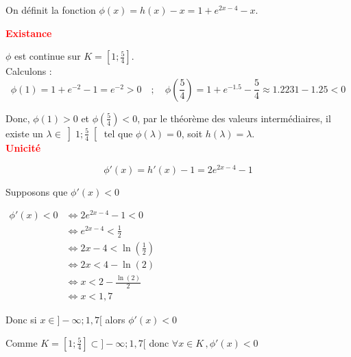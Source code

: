 \documentclass[12pt,a4paper]{article}
\begin{document}
\begin{enumerate}
\begin{enumerate}
                  On définit la fonction \( \phi(x) = h(x) - x = 1 + e^{2x - 4} - x \).

                  \textcolor{red}{\textbf{Existance}}

                  \( \phi \) est continue sur \( K = \left[1 ; \frac{5}{4} \right] \).\\
                  Calculons :
                  \[
                      \phi(1) = 1 + e^{-2} - 1 = e^{-2} > 0 \quad ; \quad \phi\left( \frac{5}{4} \right) = 1 + e^{-1.5} - \frac{5}{4} \approx 1.2231 - 1.25 < 0
                  \]

                  Donc, \( \phi(1) > 0 \) et \( \phi\left( \frac{5}{4} \right) < 0 \), par le théorème des valeurs intermédiaires, il existe un \( \lambda \in \left] 1 ; \frac{5}{4} \right[ \) tel que \( \phi(\lambda) = 0 \), soit \( h(\lambda) = \lambda \).\\

                      \textcolor{red}{\textbf{Unicité}}

                      \[
                          \phi'(x) = h'(x) - 1 = 2e^{2x - 4} - 1
                      \]

                      Supposons que \(\phi'(x)<0\)

                      \(
                      \begin{aligned}
                          \phi'(x) < 0 & \Longleftrightarrow 2e^{2x - 4} - 1 < 0                  \\
                                       & \Longleftrightarrow e^{2x - 4} < \frac{1}{2}             \\
                                       & \Longleftrightarrow 2x - 4 < \ln\left(\frac{1}{2}\right) \\
                                       & \Longleftrightarrow 2x < 4 - \ln(2)                      \\
                                       & \Longleftrightarrow x < 2 - \frac{\ln(2)}{2}             \\
                                       & \Longleftrightarrow x < 1,7
                      \end{aligned}
                      \)

                      Donc si \( x\in ]-\infty ;1,7[ \) alors \(\phi'(x) < 0\)

                  Comme \( K = \left[1 ; \frac{5}{4} \right] \subset ]-\infty ;1,7[ \) donc \( \forall x \in K\, , \phi'(x) < 0\)


\end{enumerate}
\end{enumerate}
\end{document}
